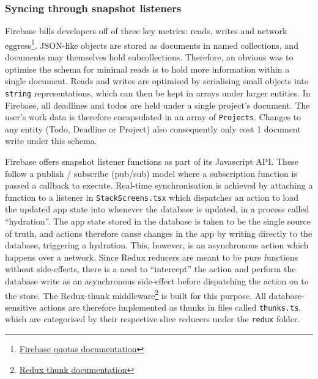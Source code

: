 \subsubsection{Syncing through snapshot listeners}
Firebase bills developers off of three key metrics: reads, writes and network eggress\footnote{\href{https://cloud.google.com/firestore/quotas}{Firebase quotas documentation}}. JSON-like objects are stored as documents in named collections, and documents may themselves hold subcollections. Therefore, an obvious was to optimise the schema for minimal reads is to hold more information within a single document. Reads and writes are optimised by serialising small objects into \texttt{string} representations, which can then be kept in arrays under larger entities. In Firebase, all deadlines and todos are held under a single project's document. The user's work data is therefore encapsulated in an array of \texttt{Projects}. Changes to any entity (Todo, Deadline or Project) also consequently only cost 1 document write under this schema.

Firebase offers snapshot listener functions as part of its Javascript API. These follow a publish / subscribe (pub/sub) model where a subscription function is passed a callback to execute. Real-time synchronisation is achieved by attaching a function to a listener in \texttt{StackScreens.tsx} which dispatches an action to load the updated app state into whenever the database is updated, in a process called ``hydration''. The app state stored in the database is taken to be the single source of truth, and actions therefore cause changes in the app by writing directly to the database, triggering a hydration. This, however, is an asynchronous action which happens over a network. Since Redux reducers are meant to be pure functions without side-effects, there is a need to ``intercept'' the action and perform the database write as an asynchronous side-effect before dispatching the action on to the store. The Redux-thunk middleware\footnote{\href{https://github.com/reduxjs/redux-thunk}{Redux thunk documentation}} is built for this purpose. All database-sensitive actions are therefore implemented as thunks in files called \texttt{thunks.ts}, which are categorised by their respective slice reducers under the \texttt{redux} folder.


